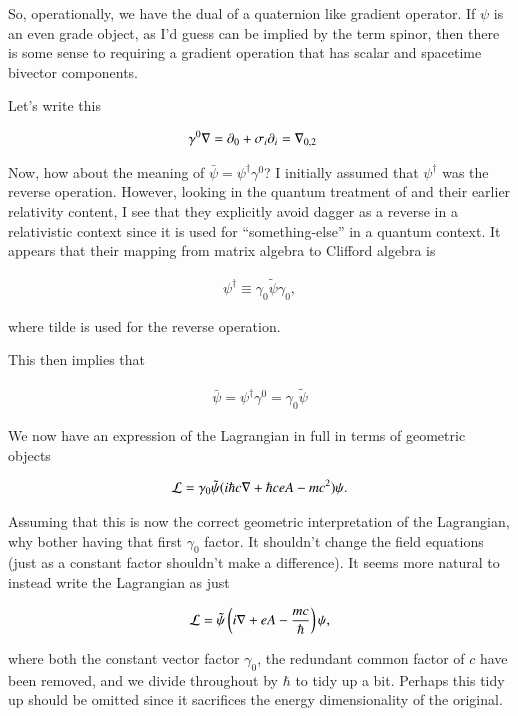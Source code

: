 So, operationally, we have the dual of a quaternion like gradient operator.  If $\psi$ is an even grade object, as I'd guess can be implied by
the term spinor, then there is some sense to requiring a gradient operation that has scalar and spacetime bivector components.

Let's write this

\begin{align*}
\gamma^0 \nabla &= \partial_0 + \sigma_i \partial_i = {\nabla}_{0,2}
\end{align*}

Now, how about the meaning of $\bar\psi = \psi^\dagger \gamma^0$?  I initially assumed that $\psi^\dagger$ was the reverse operation.
However, looking in the quantum treatment of \cite{doran2003gap} and their earlier relativity content, I see that they explicitly avoid dagger as a reverse in a relativistic context since it is used for ``something-else'' in a quantum context.  It appears that their mapping from matrix algebra to Clifford 
algebra is 

\begin{align*}
\psi^\dagger \equiv \gamma_0 \tilde{\psi} \gamma_0,
\end{align*}

where tilde is used for the reverse operation.

This then implies that 

\begin{align*}
\bar \psi = \psi^\dagger \gamma^0 = \gamma_0 \tilde{\psi}
\end{align*}

We now have an expression of the Lagrangian in full in terms of geometric objects

\begin{align}\label{eqn:diracLag:lag2}
\mathcal{L} = \gamma_0 \tilde{\psi} ( i \hbar c \nabla + \hbar c e A - mc^2) \psi.
\end{align}

Assuming that this is now the correct geometric interpretation of the Lagrangian, why bother having that first $\gamma_0$ factor.  It shouldn't change the field equations (just as a constant factor shouldn't make a difference).  It seems more natural to instead write the Lagrangian as just

\begin{align}\label{eqn:diracLag:lag3}
\mathcal{L} = \tilde{\psi} \left( i \nabla + e A - \frac{mc}{\hbar} \right) \psi,
\end{align}

where both the constant vector factor $\gamma_0$, the redundant common factor of $c$ have been removed, and we divide throughout by $\hbar$ to tidy up a bit.  Perhaps this tidy up should be omitted since it sacrifices the 
energy dimensionality of the original.

